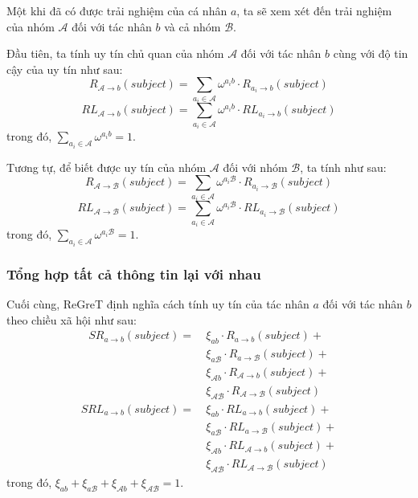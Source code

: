 Một khi đã có được trải nghiệm của cá nhân $a$, ta sẽ xem xét đến trải nghiệm của nhóm $\mathcal{A}$ đối với tác nhân $b$ và cả nhóm $\mathcal{B}$.

Đầu tiên, ta tính uy tín chủ quan của nhóm $\mathcal{A}$ đối với tác nhân $b$ cùng với độ tin cậy của uy tín như sau:
\[R_{\mathcal{A} \rightarrow b}(subject)=\sum_{a_i \in \mathcal{A}} \omega^{a_ib} \cdot R_{a_i \rightarrow b}(subject)\]
\[RL_{\mathcal{A} \rightarrow b}(subject)=\sum_{a_i \in \mathcal{A}} \omega^{a_ib} \cdot RL_{a_i \rightarrow b}(subject)\]
trong đó, $\sum_{a_i \in \mathcal{A}} \omega^{a_ib} = 1$.

Tương tự, để biết được uy tín của nhóm $\mathcal{A}$ đối với nhóm $\mathcal{B}$, ta tính như sau:
\[R_{\mathcal{A} \rightarrow \mathcal{B}}(subject)=\sum_{a_i \in \mathcal{A}} \omega^{a_i\mathcal{B}} \cdot R_{a_i \rightarrow \mathcal{B}}(subject)\]
\[RL_{\mathcal{A} \rightarrow \mathcal{B}}(subject)=\sum_{a_i \in \mathcal{A}} \omega^{a_i\mathcal{B}} \cdot RL_{a_i \rightarrow \mathcal{B}}(subject)\]
trong đó, $\sum_{a_i \in \mathcal{A}} \omega^{a_i\mathcal{B}} = 1$.

\subsubsection{Tổng hợp tất cả thông tin lại với nhau}

Cuối cùng, ReGreT định nghĩa cách tính uy tín của tác nhân $a$ đối với tác nhân $b$ theo chiều xã hội như sau:
\begin{align*}
  SR_{a \rightarrow b}(subject) =\  & \xi_{ab} \cdot R_{a \rightarrow b}(subject) +                                       \\
                                    & \xi_{a\mathcal{B}} \cdot R_{a \rightarrow \mathcal{B}}(subject) +                   \\
                                    & \xi_{\mathcal{A}b} \cdot R_{\mathcal{A} \rightarrow b}(subject) +                   \\
                                    & \xi_{\mathcal{A}\mathcal{B}} \cdot R_{\mathcal{A} \rightarrow \mathcal{B}}(subject)
\end{align*}
\begin{align*}
  SRL_{a \rightarrow b}(subject) =\  & \xi_{ab} \cdot RL_{a \rightarrow b}(subject) +                                       \\
                                     & \xi_{a\mathcal{B}} \cdot RL_{a \rightarrow \mathcal{B}}(subject) +                   \\
                                     & \xi_{\mathcal{A}b} \cdot RL_{\mathcal{A} \rightarrow b}(subject) +                   \\
                                     & \xi_{\mathcal{A}\mathcal{B}} \cdot RL_{\mathcal{A} \rightarrow \mathcal{B}}(subject)
\end{align*}
trong đó, $\xi_{ab} + \xi_{a\mathcal{B}} + \xi_{\mathcal{A}b} + \xi_{\mathcal{A}\mathcal{B}} = 1$.

